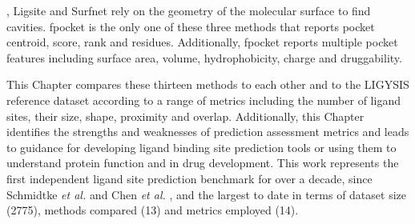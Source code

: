 \cite{GUILLOUX_2009_FPOCKET}, Ligsite \cite{HENDLICH_1997_LIGSITE} and Surfnet \cite{LASKOWSKI_1995_SURFNET} rely on the geometry of the molecular surface to find cavities. fpocket is the only one of these three methods that reports pocket centroid, score, rank and residues. Additionally, fpocket reports multiple pocket features including surface area, volume, hydrophobicity, charge and druggability. 

This Chapter compares these thirteen methods to each other and to the LIGYSIS reference dataset according to a range of metrics including the number of ligand sites, their size, shape, proximity and overlap. Additionally, this Chapter identifies the strengths and weaknesses of prediction assessment metrics and leads to guidance for developing ligand binding site prediction tools or using them to understand protein function and in drug development. This work represents the first independent ligand site prediction benchmark for over a decade, since Schmidtke \textit{et al.} \cite{SCHMIDTKE_2010_BENCHMARK} and Chen \textit{et al.} \cite{CHEN_2011_ASSESSMENT}, and the largest to date in terms of dataset size (2775), methods compared (13) and metrics employed (14).

